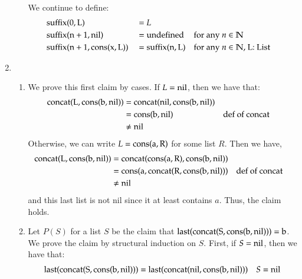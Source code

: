 \documentclass[12pt]{article}
\theoremstyle{definitionstyle}
\def\mbb#1{\mathbb{#1}}
\begin{document}
\begin{enumerate}[leftmargin=\labelsep]
\begin{enumerate}[label=(\alph*)]
            We continue to define:
            \[\begin{aligned}
                &\rm suffix(0, L) &&= L \\
                &\rm suffix(n+1, nil) &&= \rm undefined && \text{for any $n \in \mbb N$}\\
                &\rm suffix(n+1, \rm cons(x, L)) &&= \rm suffix(n, L) && \text{for any $n \in \mbb N$, L: List}
            \end{aligned}\]
        \end{enumerate}

        \newpage
        \item \begin{enumerate}[label=(\alph*)]
            \item We prove this first claim by cases. If $L = \rm nil$, then we have that:
            \begin{align*}
                \begin{aligned}
                    \rm concat(L, cons(b, nil))&= \rm concat(nil, cons(b, nil)) \\
                     &= \rm cons(b, nil) && \text{def of concat} \\
                     &\neq \rm nil
                \end{aligned}
            \end{align*}
            Otherwise, we can write $L = \rm cons(a, R)$ for some list $R$. Then we have,
            \begin{align*}
                \begin{aligned}
                    \rm concat(L, cons(b, nil)) &= \rm concat(\rm cons(a, R), \rm cons(b, nil)) \\
                    &= \rm cons(a, \rm concat(R, \rm cons(b, nil))) && \text{def of concat} \\
                    &\neq \rm nil
                \end{aligned}
            \end{align*}
            and this last list is not nil since it at least contains $a$. Thus, the claim holds.
            \item Let $P(S)$ for a list $S$ be the claim that $\rm last(concat(S, cons(b, nil))) = b$. We prove the claim by structural induction on $S$. First, if $S = \rm nil$, then we have that:
            \begin{align*}
                \begin{aligned}
                    \rm last(concat(S, cons(b, nil))) &= \rm last(concat(nil, cons(b, nil))) && \text{$S = \rm nil$}\\

\end{aligned}
\end{align*}
\end{enumerate}
\end{enumerate}
\end{document}

